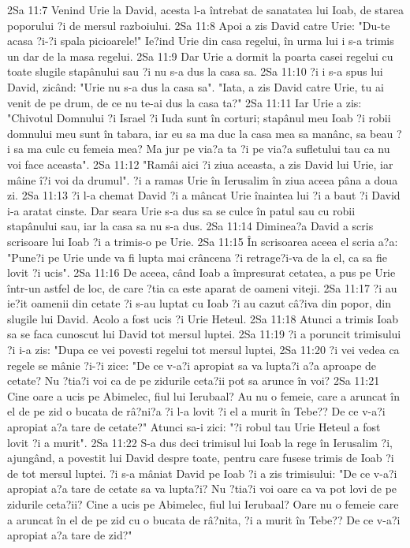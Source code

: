2Sa 11:7  Venind Urie la David, acesta l-a întrebat de sanatatea lui Ioab, de starea poporului ?i de mersul razboiului.
2Sa 11:8  Apoi a zis David catre Urie: "Du-te acasa ?i-?i spala picioarele!" Ie?ind Urie din casa regelui, în urma lui i s-a trimis un dar de la masa regelui.
2Sa 11:9  Dar Urie a dormit la poarta casei regelui cu toate slugile stapânului sau ?i nu s-a dus la casa sa.
2Sa 11:10  ?i i s-a spus lui David, zicând: "Urie nu s-a dus la casa sa". "Iata, a zis David catre Urie, tu ai venit de pe drum, de ce nu te-ai dus la casa ta?"
2Sa 11:11  Iar Urie a zis: "Chivotul Domnului ?i Israel ?i Iuda sunt în corturi; stapânul meu Ioab ?i robii domnului meu sunt în tabara, iar eu sa ma duc la casa mea sa manânc, sa beau ?i sa ma culc cu femeia mea? Ma jur pe via?a ta ?i pe via?a sufletului tau ca nu voi face aceasta".
2Sa 11:12  "Ramâi aici ?i ziua aceasta, a zis David lui Urie, iar mâine î?i voi da drumul". ?i a ramas Urie în Ierusalim în ziua aceea pâna a doua zi.
2Sa 11:13  ?i l-a chemat David ?i a mâncat Urie înaintea lui ?i a baut ?i David i-a aratat cinste. Dar seara Urie s-a dus sa se culce în patul sau cu robii stapânului sau, iar la casa sa nu s-a dus.
2Sa 11:14  Diminea?a David a scris scrisoare lui Ioab ?i a trimis-o pe Urie.
2Sa 11:15  În scrisoarea aceea el scria a?a: "Pune?i pe Urie unde va fi lupta mai crâncena ?i retrage?i-va de la el, ca sa fie lovit ?i ucis".
2Sa 11:16  De aceea, când Ioab a împresurat cetatea, a pus pe Urie într-un astfel de loc, de care ?tia ca este aparat de oameni viteji.
2Sa 11:17  ?i au ie?it oamenii din cetate ?i s-au luptat cu Ioab ?i au cazut câ?iva din popor, din slugile lui David. Acolo a fost ucis ?i Urie Heteul.
2Sa 11:18  Atunci a trimis Ioab sa se faca cunoscut lui David tot mersul luptei.
2Sa 11:19  ?i a poruncit trimisului ?i i-a zis: "Dupa ce vei povesti regelui tot mersul luptei,
2Sa 11:20  ?i vei vedea ca regele se mânie ?i-?i zice: "De ce v-a?i apropiat sa va lupta?i a?a aproape de cetate? Nu ?tia?i voi ca de pe zidurile ceta?ii pot sa arunce în voi?
2Sa 11:21  Cine oare a ucis pe Abimelec, fiul lui Ierubaal? Au nu o femeie, care a aruncat în el de pe zid o bucata de râ?ni?a ?i l-a lovit ?i el a murit în Tebe?? De ce v-a?i apropiat a?a tare de cetate?" Atunci sa-i zici: "?i robul tau Urie Heteul a fost lovit ?i a murit".
2Sa 11:22  S-a dus deci trimisul lui Ioab la rege în Ierusalim ?i, ajungând, a povestit lui David despre toate, pentru care fusese trimis de Ioab ?i de tot mersul luptei. ?i s-a mâniat David pe Ioab ?i a zis trimisului: "De ce v-a?i apropiat a?a tare de cetate sa va lupta?i? Nu ?tia?i voi oare ca va pot lovi de pe zidurile ceta?ii? Cine a ucis pe Abimelec, fiul lui Ierubaal? Oare nu o femeie care a aruncat în el de pe zid cu o bucata de râ?nita, ?i a murit în Tebe?? De ce v-a?i apropiat a?a tare de zid?"
